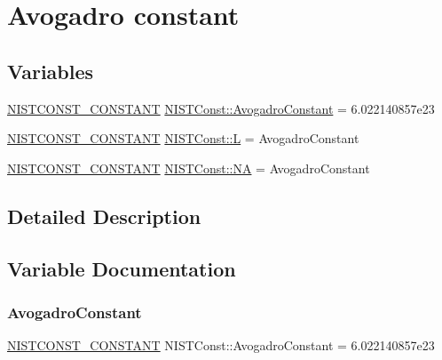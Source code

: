\hypertarget{group___n_i_s_t_const-_avogadro_constant}{}\section{Avogadro constant}
\label{group___n_i_s_t_const-_avogadro_constant}
\subsection*{Variables}
\begin{DoxyCompactItemize}
\item 
\mbox{\hyperlink{group___n_i_s_t_const-_macros_ga2b0fc1d7452373f816175dd86ce26729}{N\+I\+S\+T\+C\+O\+N\+S\+T\+\_\+\+C\+O\+N\+S\+T\+A\+NT}} \mbox{\hyperlink{group___n_i_s_t_const-_avogadro_constant_ga6bfa56f26d113ff9445c87ab17462e8a}{N\+I\+S\+T\+Const\+::\+Avogadro\+Constant}} = 6.\+022140857e23
\item 
\mbox{\hyperlink{group___n_i_s_t_const-_macros_ga2b0fc1d7452373f816175dd86ce26729}{N\+I\+S\+T\+C\+O\+N\+S\+T\+\_\+\+C\+O\+N\+S\+T\+A\+NT}} \mbox{\hyperlink{group___n_i_s_t_const-_avogadro_constant_ga700bcbfac3a5c4488d22ba4162f0fe92}{N\+I\+S\+T\+Const\+::L}} = Avogadro\+Constant
\item 
\mbox{\hyperlink{group___n_i_s_t_const-_macros_ga2b0fc1d7452373f816175dd86ce26729}{N\+I\+S\+T\+C\+O\+N\+S\+T\+\_\+\+C\+O\+N\+S\+T\+A\+NT}} \mbox{\hyperlink{group___n_i_s_t_const-_avogadro_constant_ga50ccb698ff867244ec9b249af513abff}{N\+I\+S\+T\+Const\+::\+NA}} = Avogadro\+Constant
\end{DoxyCompactItemize}


\subsection{Detailed Description}


\subsection{Variable Documentation}
\mbox{\label{group___n_i_s_t_const-_avogadro_constant_ga6bfa56f26d113ff9445c87ab17462e8a}} 
\subsubsection{\texorpdfstring{Avogadro\+Constant}{AvogadroConstant}}
{\footnotesize\ttfamily \mbox{\hyperlink{group___n_i_s_t_const-_macros_ga2b0fc1d7452373f816175dd86ce26729}{N\+I\+S\+T\+C\+O\+N\+S\+T\+\_\+\+C\+O\+N\+S\+T\+A\+NT}} N\+I\+S\+T\+Const\+::\+Avogadro\+Constant = 6.\+022140857e23}

